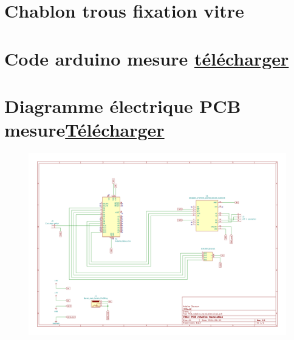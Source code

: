\begin{figure}[H]
    \centering
    
\end{figure}


\newpage
\section[Chablon trous vitre]{Chablon trous fixation vitre}\label{chablon_trous_vitre}

\begin{figure}[H]
    \centering
    
\end{figure}

\newpage
\section[Code arduino mesure]{Code arduino mesure \href{https://1drv.ms/f/s!Altwa7Vt0GlIj4Bf6049yvu0P-8YLQ?e=v7KWOI}{télécharger}}\label{code:arduino_mesure}



\section[Diagramme électrique PCB mesure]{Diagramme électrique PCB mesure\href{https://1drv.ms/f/s!Altwa7Vt0GlIjv0bGlDjWqrtS53P8w?e=SVTypX}{Télécharger}}\label{PCB:mesure}
\begin{figure}[H]
    \centering
    \includegraphics[angle = 90,height = 0.8\paperheight]{assets/Annexes/PCB_rotation_translation_diagramme_elec.pdf}
\end{figure}

